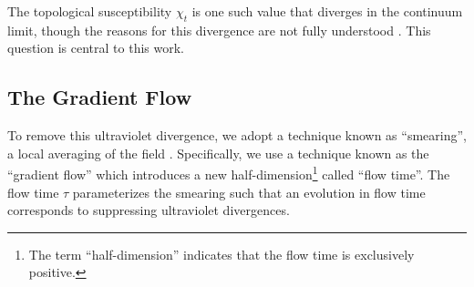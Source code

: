 The topological susceptibility $\chi_t$ is one such value that diverges in the continuum limit, though the reasons for this divergence are not fully understood \cite{berg1981}. This question is central to this work. 

\subsection{The Gradient Flow}
\label{sec:gradflow}
To remove this ultraviolet divergence, we adopt a technique known as ``smearing'', a local averaging of the field \cite{solbrig2008}. Specifically, we use a technique known as the ``gradient flow'' \cite{monahan2015} which introduces a new half-dimension\footnote{The term ``half-dimension'' indicates that the flow time is exclusively positive.} called ``flow time''.  The flow time $\tau$ parameterizes the smearing such that an evolution in flow time corresponds to suppressing ultraviolet divergences. 

